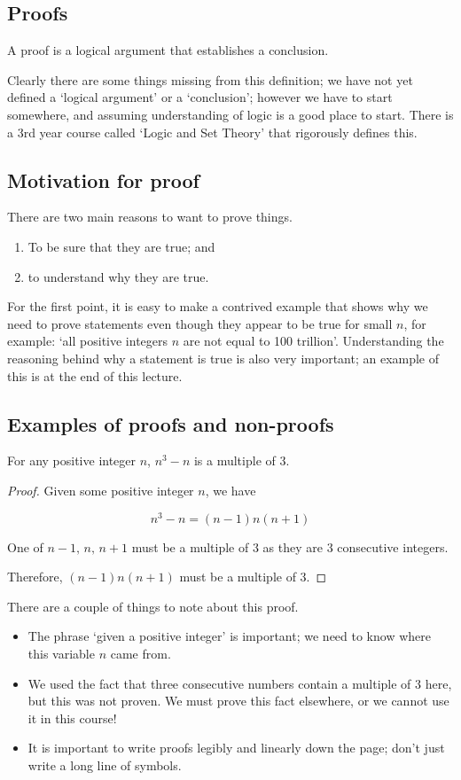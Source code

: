 \subsection{Proofs}
\begin{definition}[Proof]
	A proof is a logical argument that establishes a conclusion.
\end{definition}

Clearly there are some things missing from this definition; we have not yet defined a `logical argument' or a `conclusion'; however we have to start somewhere, and assuming understanding of logic is a good place to start.
There is a 3rd year course called `Logic and Set Theory' that rigorously defines this.

\subsection{Motivation for proof}
There are two main reasons to want to prove things.
\begin{enumerate}
	\item To be sure that they are true; and
	\item to understand why they are true.
\end{enumerate}

For the first point, it is easy to make a contrived example that shows why we need to prove statements even though they appear to be true for small \(n\), for example: `all positive integers \(n\) are not equal to 100 trillion'.
Understanding the reasoning behind why a statement is true is also very important; an example of this is at the end of this lecture.

\subsection{Examples of proofs and non-proofs}
\begin{claim}
	For any positive integer \(n\), \(n^3-n\) is a multiple of 3.
\end{claim}
\begin{proof}
	Given some positive integer \(n\), we have

	\[
		n^3 - n = (n-1)n(n+1)
	\]

	One of \(n-1,\,n,\,n+1\) must be a multiple of 3 as they are 3 consecutive integers.

	Therefore, \((n-1)n(n+1)\) must be a multiple of 3.
\end{proof}

There are a couple of things to note about this proof.
\begin{itemize}
	\item The phrase `given a positive integer' is important; we need to know where this variable \(n\) came from.
	\item We used the fact that three consecutive numbers contain a multiple of 3 here, but this was not proven.
	      We must prove this fact elsewhere, or we cannot use it in this course!
	\item It is important to write proofs legibly and linearly down the page; don't just write a long line of symbols.
\end{itemize}

